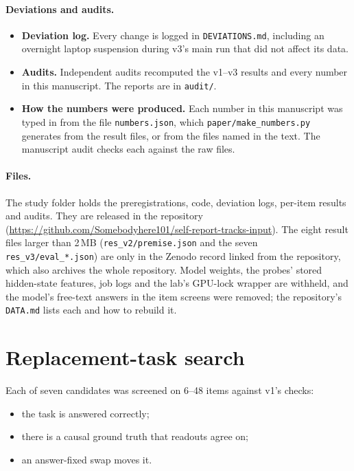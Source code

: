 \documentclass[11pt]{article}
\begin{document}
\paragraph{Deviations and audits.}
\begin{itemize}
\item \textbf{Deviation log.} Every change is logged in \texttt{DEVIATIONS.md}, including an overnight laptop suspension during v3's main run that did not affect its data.
\item \textbf{Audits.} Independent audits recomputed the v1--v3 results and every number in this manuscript. The reports are in \texttt{audit/}.
\item \textbf{How the numbers were produced.} Each number in this manuscript was typed in from the file \texttt{numbers.json}, which \texttt{paper/make\_numbers.py} generates from the result files, or from the files named in the text. The manuscript audit checks each against the raw files.
\end{itemize}

\paragraph{Files.} The study folder holds the preregistrations, code, deviation logs, per-item results and audits. They are released in the repository (\url{https://github.com/Somebodyhere101/self-report-tracks-input}). The eight result files larger than 2\,MB (\texttt{res\_v2/premise.json} and the seven \texttt{res\_v3/eval\_*.json}) are only in the Zenodo record linked from the repository, which also archives the whole repository. Model weights, the probes' stored hidden-state features, job logs and the lab's GPU-lock wrapper are withheld, and the model's free-text answers in the item screens were removed; the repository's \texttt{DATA.md} lists each and how to rebuild it.

\appendix
\section{Replacement-task search}
\label{app:search}
Each of seven candidates was screened on 6--48 items against v1's checks:
\begin{itemize}
\item the task is answered correctly;
\item there is a causal ground truth that readouts agree on;
\item an answer-fixed swap moves it.
\end{itemize}
\end{document}
